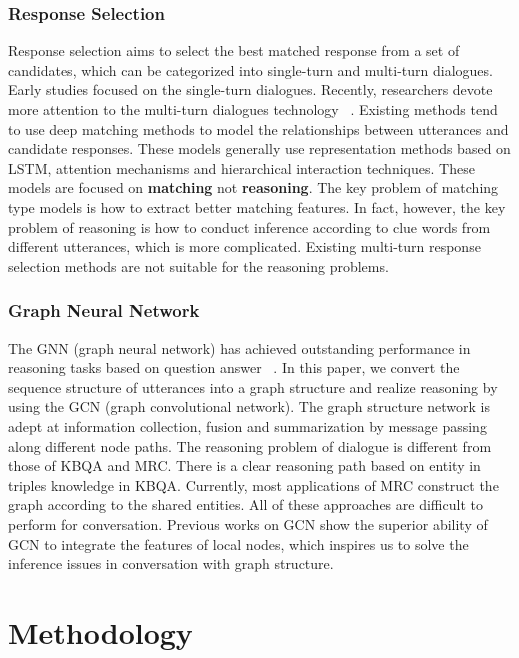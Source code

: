 \documentclass[letterpaper]{article}
\begin{document}
\subsubsection{Response Selection}
Response selection aims to select the best matched response from a set of candidates, which can be categorized into single-turn and multi-turn dialogues. Early studies focused on the single-turn dialogues. Recently, researchers devote more attention to the multi-turn dialogues technology ~\cite{Tao2019,Tao2020,Lu2020}. Existing methods tend to use deep matching methods to model the relationships between utterances and candidate responses. These models generally use representation methods based on LSTM, attention mechanisms and hierarchical interaction techniques. These models are focused on \textbf{matching} not \textbf{reasoning}. The key problem of matching type models is how to extract better matching features.  In fact, however, the key problem of reasoning is how to conduct inference according to clue words from different utterances, which is more complicated. Existing multi-turn response selection methods are not suitable for the reasoning problems.
\subsubsection{Graph Neural Network}
The GNN (graph neural network) has achieved outstanding performance in reasoning tasks based on question answer ~\cite{Qiu2020}. In this paper, we convert the sequence structure of utterances into a graph structure and realize reasoning by using the GCN (graph convolutional network). The graph structure network is adept at information collection, fusion and summarization by message passing along different node paths. The reasoning problem of dialogue is different from those of KBQA and MRC. There is a clear reasoning path based on entity in triples knowledge in KBQA. Currently, most applications of MRC construct the graph according to the shared entities. All of these approaches are difficult to perform for conversation. Previous works on GCN show the superior ability of GCN to integrate the features of local nodes, which inspires us to solve the inference issues in conversation with graph structure.
\section{Methodology}
\end{document}
